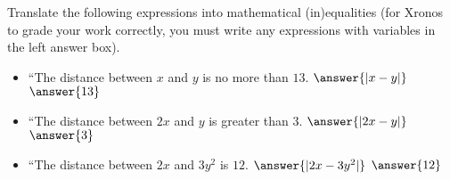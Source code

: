 \documentclass{ximera}
\begin{document}
    \begin{problem}
        Translate the following expressions into mathematical (in)equalities (for Xronos to grade your work correctly, you must write any expressions with variables in the left answer box).
        \begin{itemize}
            \item ``The distance between $x$ and $y$ is no more than $13$. $\answer{|x-y|}$ \wordChoice{\choice{$<$}\choice{$>$}\choice[correct]{$\leq$}\choice{$\geq$}\choice{$=$}} $\answer{13}$
            \item ``The distance between $2x$ and $y$ is greater than $3$. $\answer{|2x-y|}$ \wordChoice{\choice{$<$}\choice[correct]{$>$}\choice{$\leq$}\choice{$\geq$}\choice{$=$}} $\answer{3}$
            \item ``The distance between $2x$ and $3y^2$ is $12$. $\answer{|2x-3y^2|}$ \wordChoice{\choice{$<$}\choice{$>$}\choice{$\leq$}\choice{$\geq$}\choice[correct]{$=$}} $\answer{12}$
        \end{itemize}
    
    \end{problem}
\end{document}
